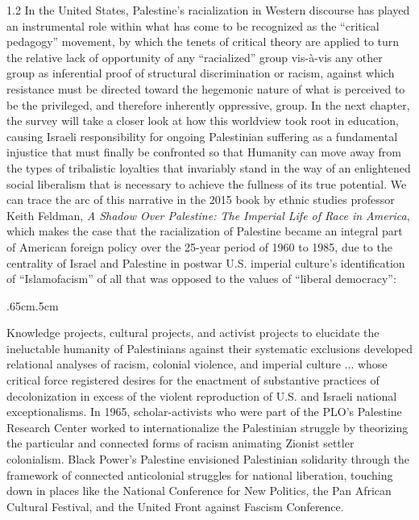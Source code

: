 \documentclass[../unravbook.tex]{subfiles}
\begin{document}
\begin{spacing}{1.2}
In the United States, Palestine's racialization in Western discourse has played an instrumental role within what has come to be recognized as the ``critical pedagogy'' movement, by which the tenets of critical theory are applied to turn the relative lack of opportunity of any ``racialized'' group vis-à-vis any other group as inferential proof of structural discrimination or racism, against which resistance must be directed toward the hegemonic nature of what is perceived to be the privileged, and therefore inherently oppressive, group. In the next chapter, the survey will take a closer look at how this worldview took root in education, causing Israeli responsibility for ongoing Palestinian suffering as a fundamental injustice that must finally be confronted so that Humanity can move away from the types of tribalistic loyalties that invariably stand in the way of an enlightened social liberalism that is necessary to achieve the fullness of its true potential. We can trace the arc of this narrative in the 2015 book by ethnic studies professor Keith Feldman, \textit{A Shadow Over Palestine: The Imperial Life of Race in America}, which makes the case that the racialization of Palestine became an integral part of American foreign policy over the 25-year period of 1960 to 1985, due to the centrality of Israel and Palestine in postwar U.S. imperial culture's identification of ``Islamofacism'' of all that was opposed to the values of ``liberal democracy'': 

\begin{adjustwidth}{.65cm}{.5cm}
    \begin{singlespace}
        Knowledge projects, cultural projects, and activist projects to elucidate the ineluctable humanity of Palestinians against their systematic exclusions developed relational analyses of racism, colonial violence, and imperial culture ... whose critical force registered desires for the enactment of substantive practices of decolonization in excess of the violent reproduction of U.S. and Israeli national exceptionalisms. In 1965, scholar-activists who were part of the PLO's Palestine Research Center worked to internationalize the Palestinian struggle by theorizing the particular and connected forms of racism animating Zionist settler colonialism. Black Power's Palestine envisioned Palestinian solidarity through the framework of connected anticolonial struggles for national liberation, touching down in places like the National Conference for New Politics, the Pan African Cultural Festival, and the United Front against Fascism Conference. 
\end{singlespace}
\end{adjustwidth}


\end{spacing}
\end{document}
